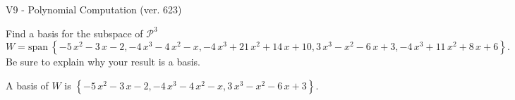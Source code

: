 \begin{exercise}
  \begin{exerciseTitle}V9 - Polynomial Computation (ver. 623)\end{exerciseTitle}
  \begin{exerciseStatement}
    Find a basis for the subspace of \(\mathcal{P}^3\) 
\[W=\mathrm{span}\ \left\{-5 \, x^{2} - 3 \, x - 2 , -4 \, x^{3} - 4 \, x^{2} - x , -4 \, x^{3} + 21 \, x^{2} + 14 \, x + 10 , 3 \, x^{3} - x^{2} - 6 \, x + 3 , -4 \, x^{3} + 11 \, x^{2} + 8 \, x + 6\right\}.\]
 Be sure to explain why your result is a basis.


  \end{exerciseStatement}
  \begin{exerciseAnswer}
   A basis of \(W\) is  \(\left\{-5 \, x^{2} - 3 \, x - 2 , -4 \, x^{3} - 4 \, x^{2} - x , 3 \, x^{3} - x^{2} - 6 \, x + 3\right\}\).
  


  \end{exerciseAnswer}
\end{exercise}